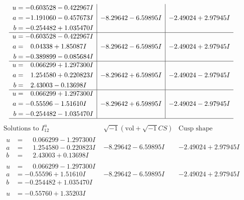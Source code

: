 \documentclass[1p]{elsarticle_modified}
\theoremstyle{definition}
\newcommand{\I}{\sqrt{-1}}
\begin{document}
$$\begin{array}{c|c|c}
\begin{aligned}
u &= -0.603528 - 0.422967 I \\
a &= -1.191060 - 0.457673 I \\
b &= -0.254482 + 1.035470 I\end{aligned}
 & -8.29642 - 6.59895 I & -2.49024 + 2.97945 I \\ \hline\begin{aligned}
u &= -0.603528 - 0.422967 I \\
a &= \phantom{-}0.04338 + 1.85087 I \\
b &= -0.389899 - 0.085684 I\end{aligned}
 & -8.29642 - 6.59895 I & -2.49024 + 2.97945 I \\ \hline\begin{aligned}
u &= \phantom{-}0.066299 + 1.297300 I \\
a &= \phantom{-}1.254580 + 0.220823 I \\
b &= \phantom{-}2.43003 - 0.13698 I\end{aligned}
 & -8.29642 + 6.59895 I & -2.49024 - 2.97945 I \\ \hline\begin{aligned}
u &= \phantom{-}0.066299 + 1.297300 I \\
a &= -0.55596 - 1.51610 I \\
b &= -0.254482 - 1.035470 I\end{aligned}
 & -8.29642 + 6.59895 I & -2.49024 - 2.97945 I\\
 \hline 
 \end{array}$$\newpage$$\begin{array}{c|c|c}  
\text{Solutions to }I^u_{12}& \I (\text{vol} + \sqrt{-1}CS) & \text{Cusp shape}\\
 \hline 
\begin{aligned}
u &= \phantom{-}0.066299 - 1.297300 I \\
a &= \phantom{-}1.254580 - 0.220823 I \\
b &= \phantom{-}2.43003 + 0.13698 I\end{aligned}
 & -8.29642 - 6.59895 I & -2.49024 + 2.97945 I \\ \hline\begin{aligned}
u &= \phantom{-}0.066299 - 1.297300 I \\
a &= -0.55596 + 1.51610 I \\
b &= -0.254482 + 1.035470 I\end{aligned}
 & -8.29642 - 6.59895 I & -2.49024 + 2.97945 I \\ \hline\begin{aligned}
u &= -0.55760 + 1.35203 I \\

\end{aligned}
\end{array}$$
\end{document}
